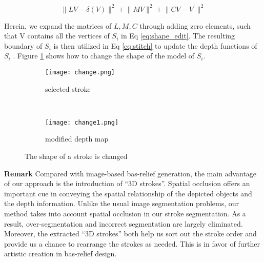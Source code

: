\begin{equation}
\lVert LV-\delta(V) \rVert ^2 + \lVert MV \rVert^2 + \lVert CV-V^{'} \rVert ^2 
\label{eq:shape_edit}
\end{equation}
 
Herein, we expand the matrices of $L,M,C$ through adding zero elements, such that V contains all the vertices of $S_i$ in Eq \ref{eq:shape_edit}. The resulting boundary of $S_i$ is then utilized in Eq \ref{eq:stitch} to update the depth functions of $S_i$ . Figure \ref{shape_edit} shows how to change the shape of the model of $S_i$. \newline 

\begin{figure}[H]
	\centering
	\begin{subfigure}[b]{0.3\textwidth}
		\texttt{[image: change.png]}
		\caption{selected stroke}
		
	\end{subfigure}
	~  
	\begin{subfigure}[b]{0.3\textwidth}
		\texttt{[image: change1.png]}
		\caption{modified depth map}
		
	\end{subfigure}
	\caption{The shape of a stroke is changed}
	\label{shape_edit}
\end{figure}

\textbf{Remark} Compared with image-based bas-relief generation, the main advantage of our approach is the introduction of “3D strokes”. Spatial occlusion offers an important cue in conveying the spatial relationship of the depicted objects and the depth information. Unlike the usual image segmentation problems, our method takes into account spatial occlusion in our stroke segmentation. As a result, over-segmentation and incorrect segmentation are largely eliminated. Moreover, the extracted “3D strokes” both help us sort out the stroke order and provide us a chance to rearrange the strokes as needed. This is in favor of further artistic creation in bas-relief design.

